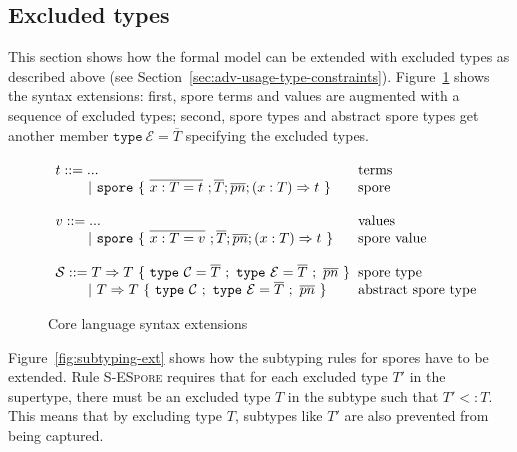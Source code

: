\documentclass{llncs}
\newcommand{\seq}[1]{\overline{#1}}
\newcommand{\ba}{\begin{array}}
\newcommand{\ea}{\end{array}}
\newcommand{\gap}{\quad\quad}
\begin{document}
\subsection{Excluded types}

This section shows how the formal model can be extended with excluded types as described above (see Section~\ref{sec:adv-usage-type-constraints}). Figure~\ref{fig:syntax-ext} shows the syntax extensions: first, spore terms and values are augmented with a sequence of excluded types; second, spore types and abstract spore types get another member $\texttt{type}~\mathcal{E} = \seq{T}$ specifying the excluded types.

\begin{figure}[ht!]
  \centering

  $\ba[t]{l@{\hspace{2mm}}l}
t ::=     ...                               & \mbox{terms}
\\
\gap ~|~  \texttt{spore}~\{~\seq{x : T = t}~; \seq{T}; \seq{pn} ; (x: T) \Rightarrow t~\}  & \mbox{spore}
\\
 & \\
v ::=     ...                               & \mbox{values}
\\
\gap ~|~  \texttt{spore}~\{~\seq{x : T = v}~; \seq{T}; \seq{pn} ; (x: T) \Rightarrow t~\}  & \mbox{spore value}
\\
 & \\
\mathcal{S} ::= T \Rightarrow T~\{~\texttt{type}~\mathcal{C} = \seq{T}~;~\texttt{type}~\mathcal{E} = \seq{T}~;~\seq{pn}~\}   & \mbox{spore type}
\\
\gap ~|~  T \Rightarrow T~\{~\texttt{type}~\mathcal{C}~;~\texttt{type}~\mathcal{E} = \seq{T}~;~\seq{pn}~\}   & \mbox{abstract spore type}
\\
\ea$

  \caption{Core language syntax extensions}
  \label{fig:syntax-ext}
\end{figure}


Figure~\ref{fig:subtyping-ext} shows how the subtyping rules for spores have to be extended. Rule \textsc{S-ESpore} requires that for each excluded type $T'$ in the supertype, there must be an excluded type $T$ in the subtype such that $T' <: T$. This means that by excluding type $T$, subtypes like $T'$ are also prevented from being captured.
\end{document}
